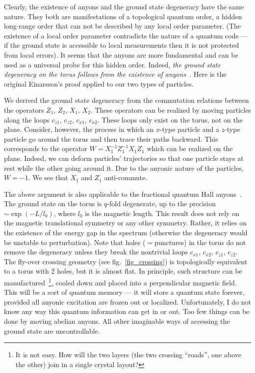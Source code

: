 \documentclass[12pt]{article}
\begin{document}
Clearly, the existence of anyons and the ground state degeneracy have the same 
nature. They both are manifestations of a topological quantum order, a hidden 
long-range order that can not be described by any local order parameter. (The 
existence of a local order parameter contradicts the nature of a quantum 
code --- if the ground state is accessible to local measurements then it is 
not protected from local errors). It seems that the anyons are more 
fundamental and can be used as a universal probe for this hidden order. 
Indeed, \emph{the ground state degeneracy on the torus follows from the 
existence of anyons}~\cite{Ein}. Here is the original Einarsson's proof 
applied to our two types of particles.

We derived the ground state degeneracy from the commutation relations between 
the operators $Z_1$, $Z_2$, $X_1$, $X_2$. These operators can be realized by 
moving particles along the loops $c_{z1}$, $c_{z2}$, $c_{x1}$, $c_{x2}$. These 
loops only exist on the torus, not on the plane. Consider, however, the 
process in which an $x$-type particle and a $z$-type particle go around the 
torus and then trace their paths backward. This corresponds to the operator 
$W=X_1^{-1}Z_1^{-1}X_1Z_1$ which can be realized on the plane. Indeed, we can 
deform particles' trajectories  so that one particle stays at rest while the 
other going around it. Due to the anyonic nature of the particles, $W=-1$. 
We see that $X_1$ and $Z_1$ anti-commute.

The above argument is also applicable to the fractional quantum Hall
anyons~\cite{Ein}. The ground state on the torus is $q$-fold degenerate, up to
the precision $\sim\exp(-L/l_0)$, where $l_0$ is the magnetic length. This
result does not rely on the magnetic translational symmetry or any other
symmetry. Rather, it relies on the existence of the energy gap in the spectrum
(otherwise the degeneracy would be unstable to perturbation). Note that holes
($=$punctures) in the torus do not remove the degeneracy unless they break the
nontrivial loops $c_{x1}$, $c_{x2}$, $c_{z1}$, $c_{z2}$.
The fly-over crossing geometry (see fig.~\ref{fig_crossing}) is 
topologically equivalent to a torus with 2 holes, but it is almost flat. 
In principle, such structure can be manufactured~\footnote{
  It is not easy. How will the two layers (the two crossing 
  ``roads'', one above the other) join in a single crystal layout?},
cooled down and placed into a perpendicular magnetic field. This will be a 
sort of quantum memory --- it will store a quantum state forever, provided all 
anyonic excitation are frozen out or localized. Unfortunately, I do not know 
any way this quantum information can get in or out. Too few things can be done 
by moving abelian anyons. All other imaginable ways of accessing the ground 
state are uncontrollable.
\end{document}

